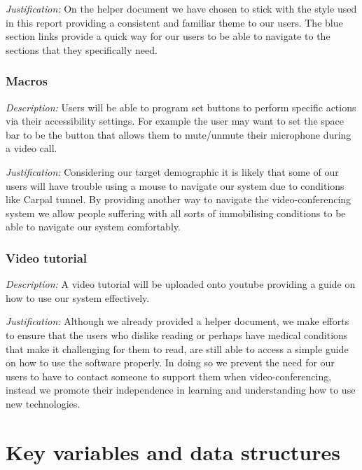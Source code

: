 \textit{Justification:}
On the helper document we have chosen to stick with the
style used in this report providing a consistent and 
familiar theme to our users. The blue section links 
provide a quick way for our users to be able to navigate
to the sections that they specifically need. 

\subsubsection{Macros}

\textit{Description:}
Users will be able to program set buttons to perform 
specific actions via their accessibility settings. For
example the user may want to set the space bar to be the
button that allows them to mute/unmute their microphone 
during a video call. \\ \vspace{0.2cm}

\textit{Justification:}
Considering our target demographic it is likely that 
some of our users will have trouble using a mouse 
to navigate our system due to conditions like Carpal tunnel.
By providing another way to navigate the video-conferencing 
system we allow people suffering with all sorts of 
immobilising conditions to be able to navigate our system 
comfortably.

\subsubsection{Video tutorial}

\textit{Description:}
A video tutorial will be uploaded onto youtube providing a 
guide on how to use our system effectively. \\ \vspace{0.2cm}

\textit{Justification:}
Although we already provided a helper document, we make
efforts to ensure that the users who dislike reading or
perhaps have medical conditions that make it challenging for 
them to read, are still able to access a simple guide on 
how to use the software properly. In doing so we prevent the 
need for our users to have to contact someone to support them
when video-conferencing, instead we promote their
independence in learning and understanding how to use new 
technologies.

\section{Key variables and data structures}

